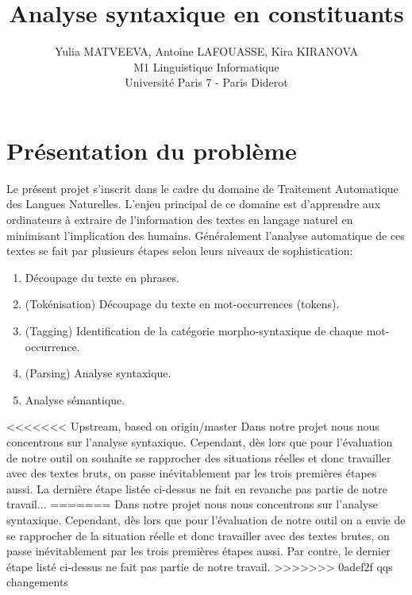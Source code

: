 \documentclass[12pt]{article}
\begin{document}
\title{Analyse syntaxique en constituants}
\author{Yulia MATVEEVA, Antoine LAFOUASSE, Kira KIRANOVA\\
M1 Linguistique Informatique\\
Universit\'e Paris 7 - Paris Diderot}
\date{}
\maketitle

\section{Pr\'esentation du probl\`eme}

Le pr\'esent projet s'inscrit dans le cadre du domaine de Traitement Automatique
des Langues Naturelles. L'enjeu principal de ce domaine est d'apprendre aux ordinateurs  \`a extraire de l'information des textes en langage naturel en minimisant l'implication des humains. G\'en\'eralement l'analyse automatique de ces textes se fait par plusieurs \'etapes selon leurs niveaux de sophistication:

\begin{enumerate}
\item D\'ecoupage du texte en phrases.
\item (Tok\'enisation) D\'ecoupage du texte en mot-occurrences (tokens).
\item (Tagging) Identification de la cat\'egorie morpho-syntaxique de chaque
mot-occurrence.
\item (Parsing) Analyse syntaxique.
\item Analyse s\'emantique.
\end{enumerate}

<<<<<<< Upstream, based on origin/master
Dans notre projet nous nous concentrons sur l'analyse syntaxique. Cependant, d\`es lors que pour l'\'evaluation de notre outil on souhaite se rapprocher des situations r\'eelles et donc travailler avec des textes bruts, on passe in\'evitablement par les trois premi\`eres \'etapes aussi. La derni\`ere \'etape list\'ee ci-dessus ne fait en revanche pas partie de notre travail...
=======
Dans notre projet nous nous concentrons sur l'analyse syntaxique. Cependant, d\`es
lors que pour l'\'evaluation de notre outil on a envie de se rapprocher de la
situation r\'eelle et donc travailler avec des textes brutes, on passe
in\'evitablement par les trois premi\`eres \'etapes aussi. Par contre, le dernier
\'etape list\'e ci-dessus ne fait pas partie de notre travail.
>>>>>>> 0adef2f qqs changements
\end{document}
